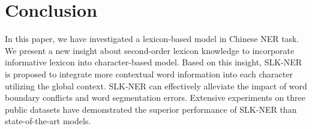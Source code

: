\documentclass[conference]{IEEEtran}
\begin{document}
\section{Conclusion}
In this paper, we have investigated a lexicon-based model
in Chinese NER task.
We present a new insight about second-order lexicon knowledge 
to incorporate informative lexicon into character-based model.
Based on this insight, SLK-NER is proposed 
to integrate more contextual word information into each character utilizing the global context. 
SLK-NER can effectively alleviate the impact of word boundary conflicts and 
word segmentation errors.
Extensive experiments on three public datasets have demonstrated 
 the superior performance of SLK-NER than state-of-the-art models.
\end{document}
